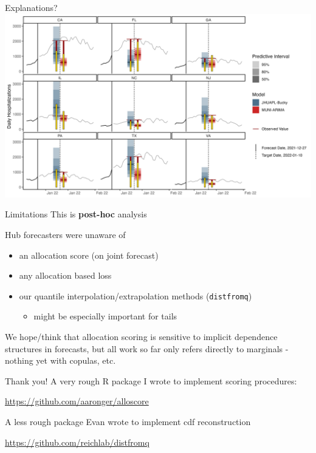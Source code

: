 \documentclass[
  9pt,
  ignorenonframetext,
]{beamer}
\providecommand{\tightlist}{%
  \setlength{\itemsep}{0pt}\setlength{\parskip}{0pt}}\usepackage{longtable,booktabs,array}
\begin{document}
\begin{frame}{Explanations?}
\protect\hypertarget{explanations}{}
\includegraphics{../plots/output/mvbucky_dist_alloc.png}
\end{frame}

\begin{frame}[fragile]{Limitations}
\protect\hypertarget{limitations}{}
This is \textbf{post-hoc} analysis

Hub forecasters were unaware of

\begin{itemize}
\item
  an allocation score (on joint forecast)
\item
  any allocation based loss
\item
  our quantile interpolation/extrapolation methods (\texttt{distfromq})

  \begin{itemize}
  \tightlist
  \item
    might be especially important for tails
  \end{itemize}
\end{itemize}

We hope/think that allocation scoring is sensitive to implicit
dependence structures in forecasts, but all work so far only refers
directly to marginals - nothing yet with copulas, etc.

\begin{block}{Thank you!}
\protect\hypertarget{thank-you}{}
A very rough R package I wrote to implement scoring procedures:

\url{https://github.com/aaronger/alloscore}

A less rough package Evan wrote to implement cdf reconstruction

\url{https://github.com/reichlab/distfromq}
\end{block}
\end{frame}
\end{document}
